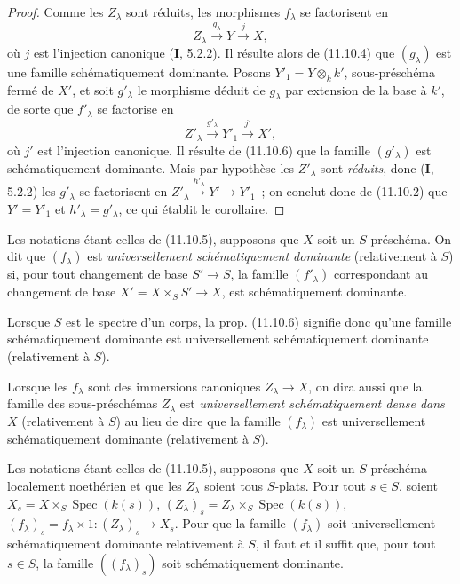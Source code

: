 \begin{proof}
Comme les $Z_\lambda$ sont réduits, les morphismes $f_\lambda$ se factorisent
en
\[
Z_\lambda\xrightarrow{g_\lambda}Y\xrightarrow{j}X,
\]
où $j$ est l'injection canonique ($\mathbf I$, 5.2.2). Il résulte alors de
(11.10.4) que $(g_\lambda)$ est une famille schématiquement dominante. Posons
$Y'_1=Y\otimes_k k'$, sous-préschéma fermé de $X'$, et soit $g'_\lambda$ le
morphisme déduit de $g_\lambda$ par extension de la base à $k'$, de sorte que
$f'_\lambda$ se factorise en
\[
Z'_\lambda\xrightarrow{g'_\lambda}Y'_1\xrightarrow{j'}X',
\]
où $j'$ est l'injection canonique. Il résulte de (11.10.6) que la famille
$(g'_\lambda)$ est schématiquement dominante. Mais par hypothèse les
$Z'_\lambda$ sont \emph{réduits}, donc ($\mathbf I$, 5.2.2) les
$g'_\lambda$ se factorisent en $Z'_\lambda\xrightarrow{h'_\lambda}Y'\to Y'_1$~; on conclut donc
de (11.10.2) que $Y'=Y'_1$ et $h'_\lambda=g'_\lambda$, ce qui établit le
corollaire.
\end{proof}

\begin{definition}[11.10.8]
\label{IV.11.10.8-fr}
Les notations étant celles de (11.10.5), supposons que $X$ soit un
$S$-préschéma. On dit que $(f_\lambda)$ est \emph{universellement
schématiquement dominante} (relativement à $S$) si, pour tout changement de
base $S'\to S$, la famille $(f'_\lambda)$ correspondant au changement de base
$X'=X\times_SS'\to X$, est schématiquement dominante.
\end{definition}

Lorsque $S$ est le spectre d'un corps, la prop. (11.10.6) signifie donc qu'une
famille schématiquement dominante est universellement schématiquement
dominante (relativement à $S$).

Lorsque les $f_\lambda$ sont des immersions canoniques $Z_\lambda\to X$, on
dira aussi que la famille des sous-préschémas $Z_\lambda$ est
\emph{universellement schématiquement dense dans $X$} (relativement à $S$) au
lieu de dire que la famille $(f_\lambda)$ est universellement schématiquement
dominante (relativement à $S$).

\begin{theorem}[11.10.9]
\label{IV.11.10.9-fr}
Les notations étant celles de (11.10.5), supposons que $X$ soit un
$S$-préschéma localement noethérien et que les $Z_\lambda$ soient tous
$S$-plats. Pour tout $s\in S$, soient
$X_s=X\times_S\operatorname{Spec}(k(s))$,
$(Z_\lambda)_s=Z_\lambda\times_S\operatorname{Spec}(k(s))$,
$(f_\lambda)_s=f_\lambda\times1:(Z_\lambda)_s\to X_s$. Pour que la famille
$(f_\lambda)$ soit universellement schématiquement dominante relativement à
$S$, il faut et il suffit que, pour tout $s\in S$, la famille
$((f_\lambda)_s)$ soit schématiquement dominante.
\end{theorem}

